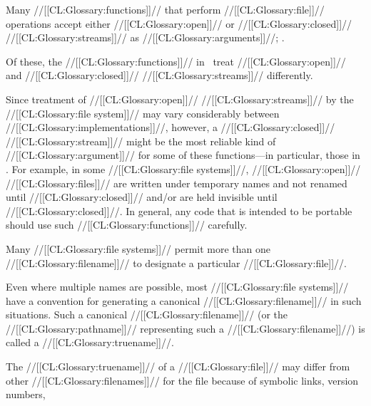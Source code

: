 
Many //[[CL:Glossary:functions]]// that perform //[[CL:Glossary:file]]// operations accept either //[[CL:Glossary:open]]// or //[[CL:Glossary:closed]]// //[[CL:Glossary:streams]]// as //[[CL:Glossary:arguments]]//; \seesection\StreamArgsToStandardizedFns.

Of these, the //[[CL:Glossary:functions]]// in \thenextfigure\ treat //[[CL:Glossary:open]]// and  //[[CL:Glossary:closed]]// //[[CL:Glossary:streams]]// differently.


Since treatment of //[[CL:Glossary:open]]// //[[CL:Glossary:streams]]// by the //[[CL:Glossary:file system]]//  may vary considerably between //[[CL:Glossary:implementations]]//, however,  a //[[CL:Glossary:closed]]// //[[CL:Glossary:stream]]// might be the most reliable kind of //[[CL:Glossary:argument]]// for some of these functions---in particular, those in \thenextfigure.  For example, in some //[[CL:Glossary:file systems]]//,  //[[CL:Glossary:open]]// //[[CL:Glossary:files]]// are written under temporary names  and not renamed until //[[CL:Glossary:closed]]// and/or are held invisible until //[[CL:Glossary:closed]]//. In general, any code that is intended to be portable should use such //[[CL:Glossary:functions]]// carefully.


\endsubsection%

 

Many //[[CL:Glossary:file systems]]// permit more than one //[[CL:Glossary:filename]]// to designate  a particular //[[CL:Glossary:file]]//.

Even where multiple names are possible, most //[[CL:Glossary:file systems]]// have a convention for generating a canonical //[[CL:Glossary:filename]]// in such situations.  Such a canonical //[[CL:Glossary:filename]]// (or the //[[CL:Glossary:pathname]]// representing such a //[[CL:Glossary:filename]]//) is called a //[[CL:Glossary:truename]]//.  

The //[[CL:Glossary:truename]]// of a //[[CL:Glossary:file]]// may differ from other //[[CL:Glossary:filenames]]// for the file because of
     symbolic links,
     version numbers,

